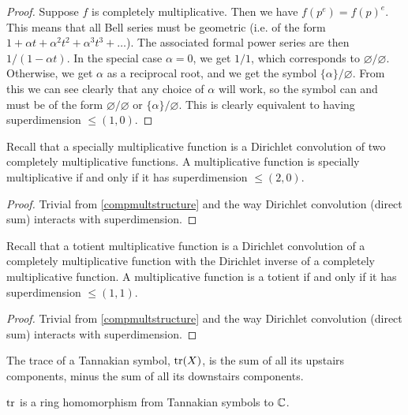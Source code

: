 \begin{proof}
Suppose $f$ is completely multiplicative. Then we have $f(p^e) = f(p)^e$. This means that all Bell series must be geometric (i.e. of the form $1 + \alpha t + \alpha^2 t^2 + \alpha^3 t^3 + \ldots$). The associated formal power series are then $1/(1 - \alpha t)$. In the special case $\alpha=0$, we get $1/1$, which corresponds to $\varnothing/\varnothing$. Otherwise, we get $\alpha$ as a reciprocal root, and we get the symbol $\{\alpha\}/\varnothing$. From this we can see clearly that any choice of $\alpha$ will work, so the symbol can and must be of the form $\varnothing/\varnothing$ or $\{\alpha\}/\varnothing$. This is clearly equivalent to having superdimension $\le (1, 0)$.
\end{proof}

\begin{proposition}
Recall that a specially multiplicative function is a Dirichlet convolution of two completely multiplicative functions. A multiplicative function is specially multiplicative if and only if it has superdimension $\le (2, 0)$.
\end{proposition}

\begin{proof}
Trivial from \ref{compmultstructure} and the way Dirichlet convolution (direct sum) interacts with superdimension.
\end{proof}

\begin{proposition}
Recall that a totient multiplicative function is a Dirichlet convolution of a completely multiplicative function with the Dirichlet inverse of a completely multiplicative function. A multiplicative function is a totient if and only if it has superdimension $\le (1, 1)$.
\end{proposition}

\begin{proof}
Trivial from \ref{compmultstructure} and the way Dirichlet convolution (direct sum) interacts with superdimension.
\end{proof}


\begin{definition}
The trace of a Tannakian symbol, $\mathrm{tr}(X)$, is the sum of all its upstairs components, minus the sum of all its downstairs components.
\end{definition}

\begin{proposition}
$\mathrm{tr}$ is a ring homomorphism from Tannakian symbols to $\mathbb{C}$.
\end{proposition}


